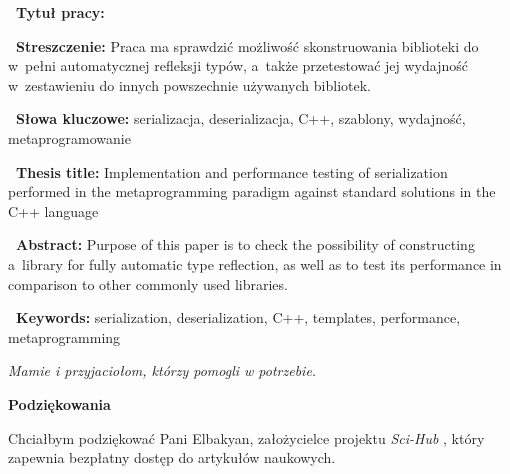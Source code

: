 \documentclass[12pt]{article}
\newcommand{\polishkeywords}{serializacja, deserializacja, C++, szablony, wydajność, metaprogramowanie}
\newcommand{\disablewordwrap}{%
	\setlength{\hsize}{0.9\hsize}
	\hyphenpenalty=10000
	\hbadness=10000}
\newcommand{\nonpl}[1]{{\it #1}}
\begin{document}
	{
		\disablewordwrap
		\large

		\vspace*{\vfill}

		{\bfseries\ Tytuł pracy:} \MyTitle

		\vspace*{\vfill}

		{\bfseries\ Streszczenie:} Praca ma sprawdzić możliwość skonstruowania biblioteki do w~pełni automatycznej refleksji typów, a~także przetestować jej wydajność w~zestawieniu do innych powszechnie używanych bibliotek.

		\vspace*{\vfill}

		{\bfseries\ Słowa kluczowe:} \polishkeywords

		\vspace*{\vfill}

		{\bfseries\ Thesis title:} Implementation and performance testing of serialization performed in the metaprogramming paradigm against standard solutions in the C++ language

		\vspace*{\vfill}

		{\bfseries\ Abstract:} Purpose of this paper is to check the possibility of constructing a~library for fully automatic type reflection, as well as to test its performance in comparison to other commonly used libraries.

		\vspace*{\vfill}

		{\bfseries\ Keywords:} serialization, deserialization, C++, templates, performance, metaprogramming

		\vspace*{\vfill}

		\thispagestyle{empty}
		\newpage
	}

	{
		\vspace*{\vfill}
		\vfill

		{
			\begin{flushright}
				\it Mamie i przyjaciołom, którzy pomogli w potrzebie.
			\end{flushright}
		}

		\vspace*{4cm}
		\newpage
	}

	{
		\vspace*{\vfill}
		\vfill

		\begin{center}
			{\Large{\textbf{Podziękowania}}}

			\vspace*{1cm}

			Chciałbym podziękować Pani Elbakyan, założycielce projektu \nonpl{Sci-Hub} \cite{scihub}, który zapewnia
			bezpłatny dostęp do artykułów naukowych.
		\end{center}

		\vspace*{\vfill}
		\vfill

		\newpage
	}
\end{document}
